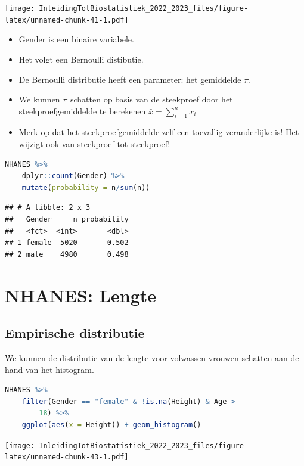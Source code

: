 \documentclass[
  12pt,dutch,coursenotes]{book}
\providecommand{\tightlist}{%
  \setlength{\itemsep}{0pt}\setlength{\parskip}{0pt}}
\begin{document}
\texttt{[image: InleidingTotBiostatistiek\_2022\_2023\_files/figure-latex/unnamed-chunk-41-1.pdf]}

\begin{itemize}
\tightlist
\item
  Gender is een binaire variabele.
\item
  Het volgt een Bernoulli distibutie.
\item
  De Bernoulli distributie heeft een parameter: het gemiddelde \(\pi\).
\item
  We kunnen \(\pi\) schatten op basis van de steekproef door het steekproefgemiddelde te berekenen \(\bar x = \sum\limits_{i=1}^n x_i\)
\item
  Merk op dat het steekproefgemiddelde zelf een toevallig veranderlijke is! Het wijzigt ook van steekproef tot steekproef!
\end{itemize}

\begin{lstlisting}[language=R]
NHANES %>%
    dplyr::count(Gender) %>%
    mutate(probability = n/sum(n))
\end{lstlisting}

\begin{lstlisting}
## # A tibble: 2 x 3
##   Gender     n probability
##   <fct>  <int>       <dbl>
## 1 female  5020       0.502
## 2 male    4980       0.498
\end{lstlisting}

\hypertarget{nhanes-lengte}{%
\section{NHANES: Lengte}\label{nhanes-lengte}}

\hypertarget{empirische-distributie}{%
\subsection{Empirische distributie}\label{empirische-distributie}}

We kunnen de distributie van de lengte voor volwassen vrouwen schatten aan de hand van het histogram.

\begin{lstlisting}[language=R]
NHANES %>%
    filter(Gender == "female" & !is.na(Height) & Age >
        18) %>%
    ggplot(aes(x = Height)) + geom_histogram()
\end{lstlisting}

\texttt{[image: InleidingTotBiostatistiek\_2022\_2023\_files/figure-latex/unnamed-chunk-43-1.pdf]}
\end{document}
